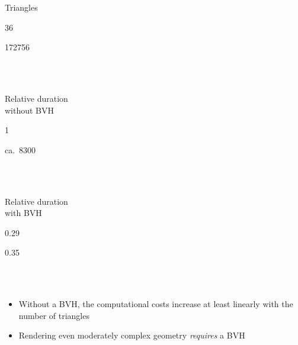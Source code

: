 \documentclass[utf8,stillsansserifmath,fleqn,t]{beamer}
\begin{document}
\begin{frame}[label=bvh-results]
\begin{minipage}{.33\textwidth}
Triangles
\end{minipage}\hfill
\begin{minipage}{.33\textwidth}
\centerline{36}
\end{minipage}\hfill
\begin{minipage}{.33\textwidth}
\centerline{172756}
\end{minipage}\\~\\
\begin{minipage}{.33\textwidth}
Relative duration\\
without BVH
\end{minipage}\hfill
\begin{minipage}{.33\textwidth}
\centerline{1}
\end{minipage}\hfill
\begin{minipage}{.33\textwidth}
\centerline{ca.~8300}
\end{minipage}\\~\\
\begin{minipage}{.33\textwidth}
Relative duration\\
with BVH
\end{minipage}\hfill
\begin{minipage}{.33\textwidth}
\centerline{0.29}
\end{minipage}\hfill
\begin{minipage}{.33\textwidth}
\centerline{0.35}
\end{minipage}\\~\\
\begin{itemize}
\item Without a BVH, the computational costs increase at least linearly with the
number of triangles
\item Rendering even moderately complex geometry \emph{requires} a BVH
\end{itemize}
%
%
%
%
\end{frame}
\end{document}
